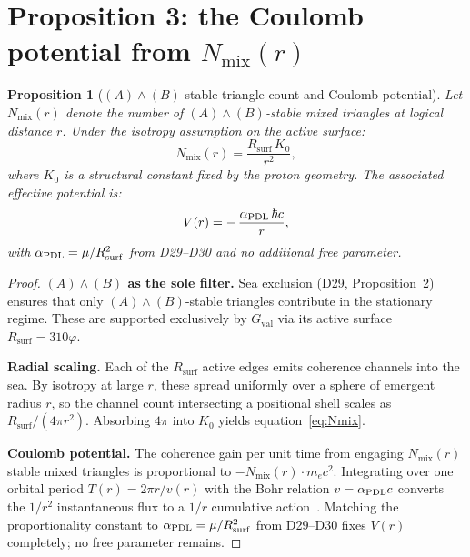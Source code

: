 \documentclass[11pt,a4paper]{article}
\newtheorem{proposition}[theorem]{Proposition}
\theoremstyle{definition}
\newcommand{\PDL}{\textnormal{PDL}}
\newcommand{\Rsurf}{R_{\mathrm{surf}}}
\newcommand{\hb}{\hbar}
\newcommand{\vp}{\varphi}
\newcommand{\aPDL}{\alpha_{\PDL}}
\newcommand{\Gval}{G_{\mathrm{val}}}
\begin{document}
\section{Proposition 3: the Coulomb potential from \texorpdfstring{$N_{\mathrm{mix}}(r)$}{Nmix(r)}}
\label{sec:P3}

\begin{proposition}[$(A)\wedge(B)$-stable triangle count and Coulomb potential]
\label{prop:P3}
Let $N_{\mathrm{mix}}(r)$ denote the number of $(A)\wedge(B)$-stable mixed triangles at logical distance $r$. Under the isotropy assumption on the active surface:
\begin{equation}
N_{\mathrm{mix}}(r) = \frac{\Rsurf\,K_0}{r^2},
\label{eq:Nmix}
\end{equation}
where $K_0$ is a structural constant fixed by the proton geometry. The associated effective potential is:
\begin{equation}
V(r) = -\,\frac{\aPDL\,\hb c}{r},
\label{eq:V}
\end{equation}
with $\aPDL = \mu/\Rsurf^2$ from D29--D30 and no additional free parameter.
\end{proposition}

\begin{proof}
\textbf{$(A)\wedge(B)$ as the sole filter.} Sea exclusion (D29, Proposition~2) ensures that only $(A)\wedge(B)$-stable triangles contribute in the stationary regime. These are supported exclusively by $\Gval$ via its active surface $\Rsurf = 310\vp$.

\textbf{Radial scaling.} Each of the $\Rsurf$ active edges emits coherence channels into the sea. By isotropy at large $r$, these spread uniformly over a sphere of emergent radius $r$, so the channel count intersecting a positional shell scales as $\Rsurf/(4\pi r^2)$. Absorbing $4\pi$ into $K_0$ yields equation~\eqref{eq:Nmix}.

\textbf{Coulomb potential.} The coherence gain per unit time from engaging $N_{\mathrm{mix}}(r)$ stable mixed triangles is proportional to $-N_{\mathrm{mix}}(r)\cdot m_e c^2$. Integrating over one orbital period $T(r) = 2\pi r/v(r)$ with the Bohr relation $v = \aPDL c$ converts the $1/r^2$ instantaneous flux to a $1/r$ cumulative action~\cite{Schrodinger_Sketch_2026}. Matching the proportionality constant to $\aPDL = \mu/\Rsurf^2$ from D29--D30 fixes $V(r)$ completely; no free parameter remains.
\end{proof}
\end{document}
